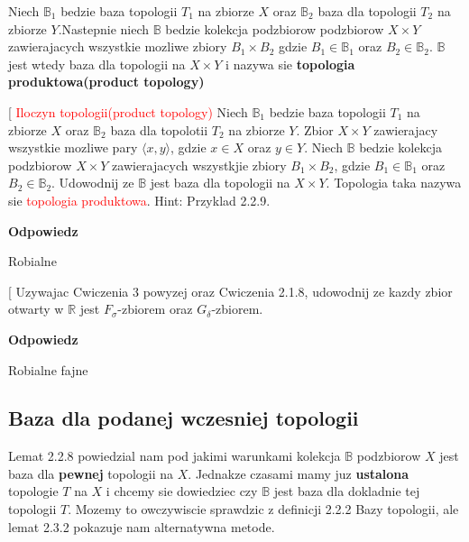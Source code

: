 \documentclass{article}
\makeatletter
\def\myitem{%
   \@ifnextchar[ \@myitem{\@noitemargtrue\@myitem[\@itemlabel]}}
\def\@myitem[#1]{\item[#1]\mbox{}\\}
\makeatother
\begin{document}
\begin{enumerate}[align=left]
\begin{enumerate}[label=(\alph*)]
        \end{enumerate}

        \begin{tcolorbox}[colback=white!90!red,colframe=black!35!red,title=Definicja: Topologia produktowa(product topology)]
            Niech $\mathbb{B}_{1}$ bedzie baza topologii $T_{1}$ na zbiorze $X$ oraz $\mathbb{B}_{2}$ baza dla topologii $T_{2}$ na zbiorze $Y$.Nastepnie niech $\mathbb{B}$ bedzie kolekcja podzbiorow podzbiorow $X \times Y$ zawierajacych wszystkie mozliwe zbiory $B_{1} \times B_{2}$ gdzie $B_{1} \in \mathbb{B}_{1}$ oraz $B_{2} \in \mathbb{B}_{2}$. $\mathbb{B}$ jest wtedy baza dla topologii na $X \times Y$ i nazywa sie \textbf{topologia produktowa(product topology)}
        
        \end{tcolorbox}

        \myitem \textcolor{red}{Iloczyn topologii(product topology)}
        Niech $\mathbb{B}_{1}$ bedzie baza topologii $T_{1}$ na zbiorze $X$ oraz $\mathbb{B}_{2}$ baza dla topolotii $T_{2}$ na zbiorze $Y$. Zbior $X \times Y$ zawierajacy wszystkie mozliwe pary $\langle x, y \rangle$, gdzie $x \in X$ oraz $y \in Y$. Niech $\mathbb{B}$ bedzie kolekcja podzbiorow $X \times Y$ zawierajacych wszystkjie zbiory $B_{1} \times B_{2}$, gdzie $B_{1} \in \mathbb{B}_{1}$ oraz $B_{2} \in \mathbb{B}_{2}$. Udowodnij ze $\mathbb{B}$ jest baza dla topologii na $X \times Y$. Topologia taka nazywa sie \textcolor{red}{topologia produktowa}. Hint: Przyklad 2.2.9.
        
        \textbf{Odpowiedz}

        Robialne


        \myitem Uzywajac Cwiczenia 3 powyzej oraz Cwiczenia 2.1.8, udowodnij ze kazdy zbior otwarty w $\mathbb{R}$ jest $F_{\sigma}$-zbiorem oraz $G_{\delta}$-zbiorem.
        
        \textbf{Odpowiedz}

        Robialne fajne

\end{enumerate}%
\subsection{Baza dla podanej wczesniej topologii}

Lemat 2.2.8 powiedzial nam pod jakimi warunkami kolekcja $\mathbb{B}$ podzbiorow $X$ jest baza dla \textbf{pewnej} topologii na $X$. Jednakze czasami mamy juz \textbf{ustalona} topologie $T$ na $X$ i chcemy sie dowiedziec czy $\mathbb{B}$ jest baza dla dokladnie tej topologii $T$. Mozemy to owczywiscie sprawdzic z definicji 2.2.2 Bazy topologii, ale lemat 2.3.2 pokazuje nam alternatywna metode.
\end{document}
